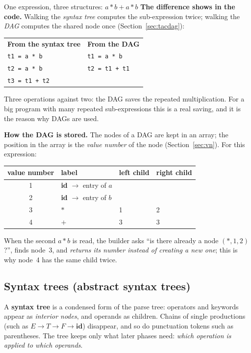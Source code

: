 \documentclass[11pt,a4paper]{article}
\begin{document}
\begin{examplebox}{One expression, three structures: $a*b + a*b$}
\textbf{The difference shows in the code.} Walking the \emph{syntax tree} computes the sub-expression twice; walking the \emph{DAG} computes the shared node once (Section~\ref{sec:tacdag}):
\begin{center}
\small
\begin{tabular}{@{}l l@{}}
\textbf{From the syntax tree} \qquad\qquad & \textbf{From the DAG} \\[2pt]
\texttt{t1 = a * b} & \texttt{t1 = a * b} \\
\texttt{t2 = a * b} & \texttt{t2 = t1 + t1} \\
\texttt{t3 = t1 + t2} & \\
\end{tabular}
\end{center}
Three operations against two: the DAG saves the repeated multiplication. For a big program with many repeated sub-expressions this is a real saving, and it is the reason why DAGs are used.

\textbf{How the DAG is stored.} The nodes of a DAG are kept in an array; the position in the array is the \emph{value number} of the node (Section~\ref{sec:vn}). For this expression:
\begin{center}
\small
\begin{tabular}{@{}c l l l@{}}
\toprule
\textbf{value number} & \textbf{label} & \textbf{left child} & \textbf{right child} \\ \midrule
1 & \textbf{id} $\to$ entry of $a$ & & \\
2 & \textbf{id} $\to$ entry of $b$ & & \\
3 & $*$ & 1 & 2 \\
4 & $+$ & 3 & 3 \\ \bottomrule
\end{tabular}
\end{center}
When the second $a*b$ is read, the builder asks ``is there already a node $(*,1,2)$?'', finds node~3, and \emph{returns its number instead of creating a new one}; this is why node~4 has the same child twice.
\end{examplebox}


\subsection{Syntax trees (abstract syntax trees)}
\label{sec:syntaxtree}
A \textbf{syntax tree} is a condensed form of the parse tree: operators and keywords appear as \emph{interior nodes}, and operands as children. Chains of single productions (such as $E\to T\to F\to\mathbf{id}$) disappear, and so do punctuation tokens such as parentheses. The tree keeps only what later phases need: \emph{which operation is applied to which operands}.
\end{document}
